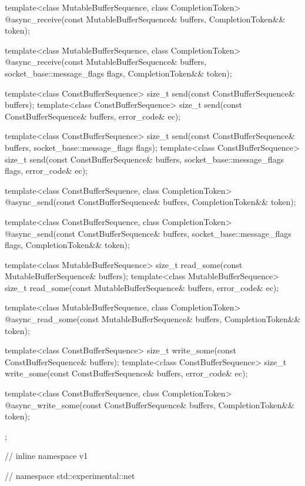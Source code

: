 \begin{codeblock}
{{{    template<class MutableBufferSequence, class CompletionToken>
      @\DEDUCED@ async_receive(const MutableBufferSequence& buffers,
                            CompletionToken&& token);

    template<class MutableBufferSequence, class CompletionToken>
      @\DEDUCED@ async_receive(const MutableBufferSequence& buffers,
                            socket_base::message_flags flags,
                            CompletionToken&& token);

    template<class ConstBufferSequence>
      size_t send(const ConstBufferSequence& buffers);
    template<class ConstBufferSequence>
      size_t send(const ConstBufferSequence& buffers, error_code& ec);

    template<class ConstBufferSequence>
      size_t send(const ConstBufferSequence& buffers,
                  socket_base::message_flags flags);
    template<class ConstBufferSequence>
      size_t send(const ConstBufferSequence& buffers,
                  socket_base::message_flags flags, error_code& ec);

    template<class ConstBufferSequence, class CompletionToken>
      @\DEDUCED@ async_send(const ConstBufferSequence& buffers,
                         CompletionToken&& token);

    template<class ConstBufferSequence, class CompletionToken>
      @\DEDUCED@ async_send(const ConstBufferSequence& buffers,
                         socket_base::message_flags flags,
                         CompletionToken&& token);

    template<class MutableBufferSequence>
      size_t read_some(const MutableBufferSequence& buffers);
    template<class MutableBufferSequence>
      size_t read_some(const MutableBufferSequence& buffers,
                       error_code& ec);

    template<class MutableBufferSequence, class CompletionToken>
      @\DEDUCED@ async_read_some(const MutableBufferSequence& buffers,
                              CompletionToken&& token);

    template<class ConstBufferSequence>
      size_t write_some(const ConstBufferSequence& buffers);
    template<class ConstBufferSequence>
      size_t write_some(const ConstBufferSequence& buffers,
                        error_code& ec);

    template<class ConstBufferSequence, class CompletionToken>
      @\DEDUCED@ async_write_some(const ConstBufferSequence& buffers,
                               CompletionToken&& token);
  };

} // inline namespace v1
} // namespace std::experimental::net
\end{codeblock}

